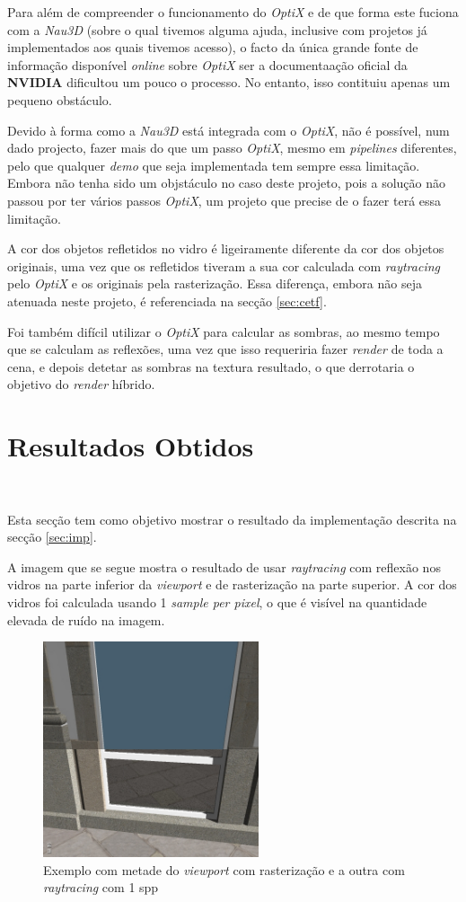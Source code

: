 \documentclass[10pt]{article}
\begin{document}
Para além de compreender o funcionamento do \textit{OptiX} e de que forma este fuciona com a \textit{Nau3D} (sobre o qual tivemos alguma ajuda, inclusive com projetos já implementados aos quais tivemos acesso), o facto da única grande fonte de informação disponível \textit{online} sobre \textit{OptiX} ser a documentaação oficial da \textbf{NVIDIA} dificultou um pouco o processo. No entanto, isso contituiu apenas um pequeno obstáculo.

Devido à forma como a \textit{Nau3D} está integrada com o \textit{OptiX}, não é possível, num dado projecto, fazer mais do que um passo \textit{OptiX}, mesmo em \textit{pipelines} diferentes, pelo que qualquer \textit{demo} que seja implementada tem sempre essa limitação. Embora não tenha sido um objstáculo no caso deste projeto, pois a solução não passou por ter vários passos \textit{OptiX}, um projeto que precise de o fazer terá essa limitação.

A cor dos objetos refletidos no vidro é ligeiramente diferente da cor dos objetos originais, uma vez que os refletidos tiveram a sua cor calculada com \textit{raytracing} pelo \textit{OptiX} e os originais pela rasterização. Essa diferença, embora não seja atenuada neste projeto, é referenciada na secção \ref{sec:cetf}.

Foi também difícil utilizar o \textit{OptiX} para calcular as sombras, ao mesmo tempo que se calculam as reflexões, uma vez que isso requeriria fazer \textit{render} de toda a cena, e depois detetar as sombras na textura resultado, o que derrotaria o objetivo do \textit{render} híbrido.

\section{Resultados Obtidos}~

Esta secção tem como objetivo mostrar o resultado da implementação descrita na secção \ref{sec:imp}.

A imagem que se segue mostra o resultado de usar \textit{raytracing} com reflexão nos vidros na parte inferior da \textit{viewport} e de rasterização na parte superior. A cor dos vidros foi calculada usando 1 \textit{sample per pixel}, o que é visível na quantidade elevada de ruído na imagem.


\begin{figure}[H]
    \centering
    \includegraphics[width=2.5in]{half_1rpp.jpg}
    \caption{Exemplo com metade do \textit{viewport} com rasterização e a outra com \textit{raytracing} com 1 spp}
\end{figure}
\end{document}
